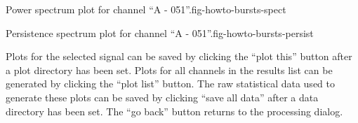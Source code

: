 {Power spectrum plot for channel ``A - 051''.}{fig-howto-bursts-spect}

{Persistence spectrum plot for channel ``A - 051''.}{fig-howto-bursts-persist}

Plots for the selected signal can be saved by clicking the ``plot this''
button after a plot directory has been set. Plots for all channels in the
results list can be generated by clicking the ``plot list'' button. The raw
statistical data used to generate these plots can be saved by clicking ``save
all data'' after a data directory has been set. The ``go back'' button returns
to the processing dialog.

%
